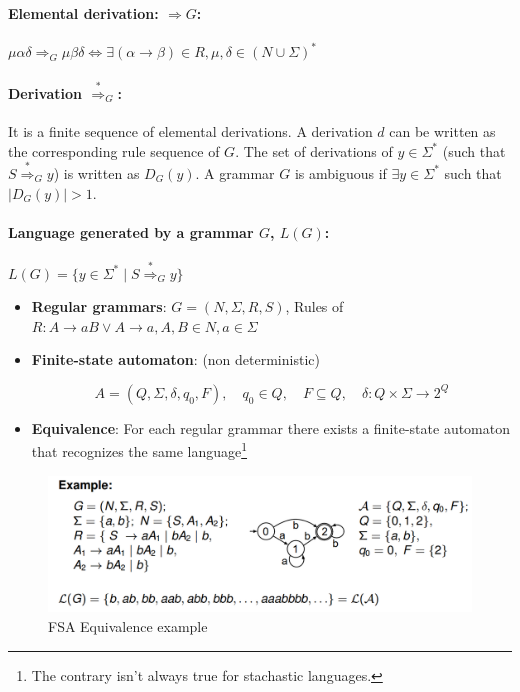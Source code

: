 \paragraph*{Elemental derivation: $\Rightarrow G$:}
$\mu \alpha \delta \Rightarrow_G \mu \beta \delta \iff \exists(\alpha \rightarrow \beta) \in R, \mu, \delta \in (N \cup \Sigma)^*$

\paragraph*{Derivation $\stackrel{*}{\Rightarrow}_G$:}
It is a finite sequence of elemental derivations.
A derivation $d$ can be written as the corresponding rule sequence of $G$.
The set of derivations of $y \in \Sigma^*$ (such that $S \stackrel{*}{\Rightarrow}_G y$) is written as $D_G(y)$.
A grammar $G$ is ambiguous if $\exists y \in \Sigma^*$ such that $|D_G(y)| > 1$.

\paragraph*{Language generated by a grammar $G$, $L(G)$:}
$L(G) = \{y \in \Sigma^* \mid S \stackrel{*}{\Rightarrow}_G y\}$

\begin{itemize}
	\item \textbf{Regular grammars}: $G = (N, \Sigma, R, S)$,
Rules of $R: A \rightarrow aB \vee A \rightarrow a, A, B \in N, a \in \Sigma$
	\item \textbf{Finite-state automaton}: (non deterministic)

   \begin{equation*}
      A = (Q, \Sigma, \delta, q_0, F ),\quad q_0 \in Q,\quad F \subseteq Q,\quad \delta : Q \times \Sigma \rightarrow 2^Q
   \end{equation*}
	\item \textbf{Equivalence}: For each regular grammar there exists a finite-state automaton that recognizes the same language\footnote{The contrary isn't always true for stachastic languages.}
\end{itemize}

\begin{figure}[htbp]
   \centering
   \includegraphics{images/07/fsaEquivalence.png}
   \caption{FSA Equivalence example}
   \label{fig:07/fsaEquivalence}
\end{figure}

